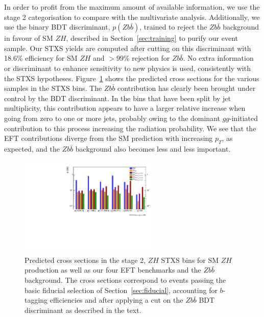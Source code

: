 %
In order to profit from the maximum amount of available information, we use the stage 2 categorisation to compare with the multivariate analysis. Additionally, we use the binary BDT discriminant, $p(Z b\bar{b})$, trained to reject the $Zb\bar{b}$ background in favour of SM $ZH$, described in Section~\ref{sec:training} to purify our event sample. Our STXS yields are computed after cutting on this discriminant with 18.6\% efficiency for SM $ZH$  and $> 99\%$ rejection for $Zb\bar{b}$. No extra information or discriminant to enhance sensitivity to new physics is used, consistently with the STXS hypotheses.  Figure~\ref{fig:stxs_crosssec} shows the predicted cross sections for the various samples in the STXS bins. The $Zb\bar{b}$ contribution has clearly been brought under control by the BDT discriminant. In the bins that have been split by jet multiplicity, this contribution appears to have a larger relative increase when going from zero to one or more jets, probably owing to the dominant $gg$-initiated contribution to this process increasing the radiation probability. We see that the EFT contributions diverge from the SM prediction with increasing $p_T$, as expected, and the $Zb\bar{b}$ background also becomes less and less important. 

\begin{figure}[h!]
\centering
\includegraphics[width=0.6\textwidth]{plots/STXS_comp.pdf}
\caption{
\label{fig:stxs_crosssec}
Predicted cross sections in the stage 2, $ZH$ STXS bins for SM $ZH$ production as well as our four EFT benchmarks and the $Zb\bar{b}$ background. The cross sections correspond to events passing the basic fiducial selection of Section~\ref{sec:fiducial}, accounting for $b$-tagging efficiencies and after applying a cut on the $Zb\bar{b}$ BDT discriminant as described in the text.
    }
\end{figure}






